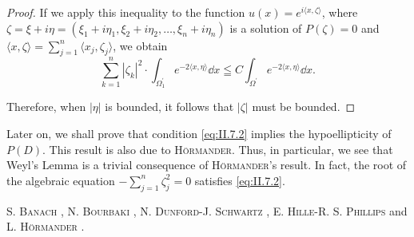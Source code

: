 \begin{proof}
If we apply this inequality to the function $u(x) = e^{i\langle x,\zeta \rangle}$, where $\zeta = \xi + i\eta = (\xi_1 + i\eta_1, \xi_2 + i\eta_2, \ldots, \xi_n + i\eta_n)$ is a solution of $P(\zeta) = 0$ and $\langle x, \zeta \rangle = \sum\limits_{j=1}^{n} \langle x_j, \zeta_j \rangle$, we obtain 
\[
\sum\limits_{k=1} ^{n} \left| \zeta_{k} \right| ^{2} \cdot \int_ {\Omega_{1} ^{\prime}} e ^{-2 \langle x, \eta \rangle} \dd x \leqq C \int_ {\Omega^{\prime}} e ^{-2 \langle x, \eta \rangle} \dd x.
\]

Therefore, when $|\eta|$ is bounded, it follows that $|\zeta|$ must be bounded. 
\end{proof}

\begin{remarku} Later on, we shall prove that condition \eqref{eq:II.7.2} implies the hypoellipticity of $P(D)$. This result is also due to \textsc{Hörmander}. Thus, in particular, we see that Weyl's Lemma is a trivial consequence of \textsc{Hörmander}'s result. In fact, the root of the algebraic equation $-\sum\limits_{j=1}^{n}\zeta_j^2 = 0$ satisfies \eqref{eq:II.7.2}. 
\end{remarku}


S. \textsc{Banach} \cite{banach9}, N. \textsc{Bourbaki} \cite{bourbaki27}, N. \textsc{Dunford}-J. \textsc{Schwartz} \cite{dunford44}, E. \textsc{Hille}-R. S. \textsc{Phillips} \cite{hille97} and L. \textsc{Hörmander} \cite{hormander118}. 
